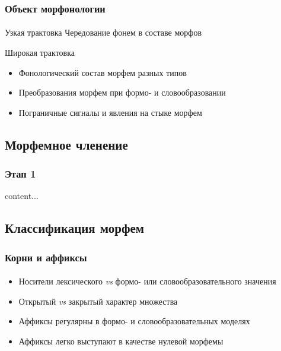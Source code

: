 \begin{frame}
    \frametitle{Объект морфонологии}
    \framesubtitle{\autocite{les}}

    \begin{alertblock}{Узкая трактовка}
        Чередование фонем в составе морфов
    \end{alertblock}

    \begin{exampleblock}{Широкая трактовка}
        \begin{itemize}
            \item Фонологический состав морфем разных типов
            \item Преобразования морфем при формо- и словообразовании
            \item Пограничные сигналы и явления на стыке морфем
        \end{itemize}
    \end{exampleblock}
\end{frame}

\subsection{Морфемное членение}


\begin{frame}
    \frametitle{Этап 1}
    content...
\end{frame}


\subsection{Классификация морфем}


\begin{frame}
    \frametitle{Корни и аффиксы}
    \framesubtitle{\autocite[13--14]{zubova_menshikova:2014}}

    \begin{itemize}
        \item Носители лексического \textit{vs} формо- или словообразовательного значения
        \item Открытый \textit{vs} закрытый характер множества
        \item Аффиксы регулярны в формо- и словообразовательных моделях
        \item Аффиксы легко выступают в качестве нулевой морфемы
    \end{itemize}
\end{frame}

